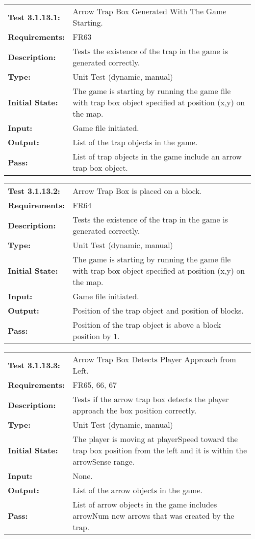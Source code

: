 \documentclass[12pt, titlepage]{article}
\begin{document}
\begin{tabular}{|l|p{10cm}|}
    \hline
    \bf{Test} 3.1.13.1: & Arrow Trap Box Generated With The Game Starting.\\
    \bf{Requirements}: & FR63\\
    \bf{Description}: & Tests the existence of the trap in the game is generated correctly.\\
    \bf{Type}: & Unit Test (dynamic, manual) \\
    \bf{Initial State}: & The game is starting by running the game file with trap box object specified at position (x,y) on the map.\\
    \bf{Input}: & Game file initiated. \\
    \bf{Output}: & List of the trap objects in the game.\\
    \bf{Pass}: & List of trap objects in the game include an arrow trap box object.\\
    \hline
\end{tabular}

\begin{tabular}{|l|p{10cm}|}
    \hline
    \bf{Test} 3.1.13.2: & Arrow Trap Box is placed on a block.\\
    \bf{Requirements}: & FR64\\
    \bf{Description}: & Tests the existence of the trap in the game is generated correctly.\\
    \bf{Type}: & Unit Test (dynamic, manual) \\
    \bf{Initial State}: & The game is starting by running the game file with trap box object specified at position (x,y) on the map.\\
    \bf{Input}: & Game file initiated. \\
    \bf{Output}: & Position of the trap object and position of blocks.\\
    \bf{Pass}: & Position of the trap object is above a block position by 1.\\
    \hline
\end{tabular}

\begin{tabular}{|l|p{10cm}|}
    \hline
    \bf{Test} 3.1.13.3: & Arrow Trap Box Detects Player Approach from Left.\\
    \bf{Requirements}: & FR65, 66, 67\\
    \bf{Description}: & Tests if the arrow trap box detects the player approach the box position correctly. \\
    \bf{Type}: & Unit Test (dynamic, manual) \\
    \bf{Initial State}: & The player is moving at playerSpeed toward the trap box position from the left and it is within the arrowSense range.\\
    \bf{Input}: & None.\\
    \bf{Output}: & List of the arrow objects in the game.\\
    \bf{Pass}: & List of arrow objects in the game includes arrowNum new arrows that was created by the trap.\\
    \hline
\end{tabular}
\end{document}
